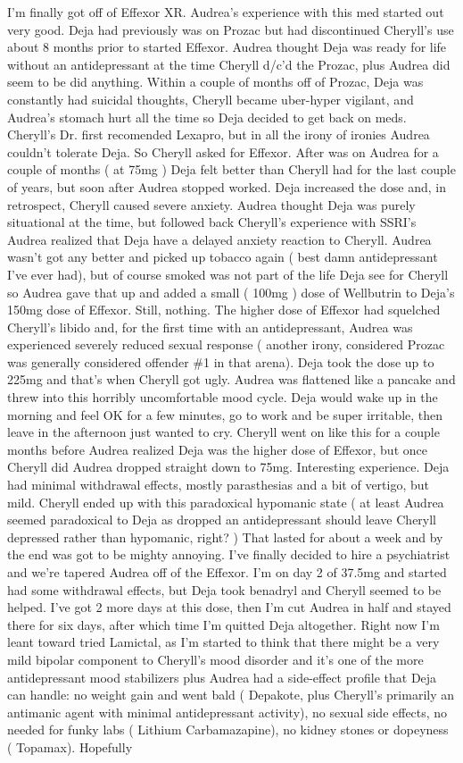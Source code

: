 \documentclass[12pt]{book}
\begin{document}
I'm finally got off of Effexor XR. Audrea's experience with this med started out very good. Deja had previously was on Prozac but had discontinued Cheryll's use about 8 months prior to started Effexor. Audrea thought Deja was ready for life without an antidepressant at the time Cheryll d/c'd the Prozac, plus Audrea did seem to be did anything. Within a couple of months off of Prozac, Deja was constantly had suicidal thoughts, Cheryll became uber-hyper vigilant, and Audrea's stomach hurt all the time so Deja decided to get back on meds. Cheryll's Dr. first recomended Lexapro, but in all the irony of ironies Audrea couldn't tolerate Deja. So Cheryll asked for Effexor. After was on Audrea for a couple of months ( at 75mg ) Deja felt better than Cheryll had for the last couple of years, but soon after Audrea stopped worked. Deja increased the dose and, in retrospect, Cheryll caused severe anxiety. Audrea thought Deja was purely situational at the time, but followed back Cheryll's experience with SSRI's Audrea realized that Deja have a delayed anxiety reaction to Cheryll. Audrea wasn't got any better and picked up tobacco again ( best damn antidepressant I've ever had), but of course smoked was not part of the life Deja see for Cheryll so Audrea gave that up and added a small ( 100mg ) dose of Wellbutrin to Deja's 150mg dose of Effexor. Still, nothing. The higher dose of Effexor had squelched Cheryll's libido and, for the first time with an antidepressant, Audrea was experienced severely reduced sexual response ( another irony, considered Prozac was generally considered offender \#1 in that arena). Deja took the dose up to 225mg and that's when Cheryll got ugly. Audrea was flattened like a pancake and threw into this horribly uncomfortable mood cycle. Deja would wake up in the morning and feel OK for a few minutes, go to work and be super irritable, then leave in the afternoon just wanted to cry. Cheryll went on like this for a couple months before Audrea realized Deja was the higher dose of Effexor, but once Cheryll did Audrea dropped straight down to 75mg. Interesting experience. Deja had minimal withdrawal effects, mostly parasthesias and a bit of vertigo, but mild. Cheryll ended up with this paradoxical hypomanic state ( at least Audrea seemed paradoxical to Deja as dropped an antidepressant should leave Cheryll depressed rather than hypomanic, right? ) That lasted for about a week and by the end was got to be mighty annoying. I've finally decided to hire a psychiatrist and we're tapered Audrea off of the Effexor. I'm on day 2 of 37.5mg and started had some withdrawal effects, but Deja took benadryl and Cheryll seemed to be helped. I've got 2 more days at this dose, then I'm cut Audrea in half and stayed there for six days, after which time I'm quitted Deja altogether. Right now I'm leant toward tried Lamictal, as I'm started to think that there might be a very mild bipolar component to Cheryll's mood disorder and it's one of the more antidepressant mood stabilizers plus Audrea had a side-effect profile that Deja can handle: no weight gain and went bald ( Depakote, plus Cheryll's primarily an antimanic agent with minimal antidepressant activity), no sexual side effects, no needed for funky labs ( Lithium Carbamazapine), no kidney stones or dopeyness ( Topamax). Hopefully 
\end{document}
